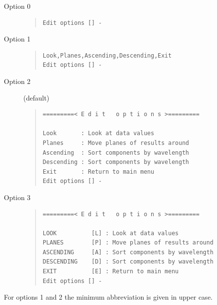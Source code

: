 \documentclass[11pt,twoside]{article}
\begin{document}

\begin{description}
\item[Option 0]\mbox{}

\begin{quote}\begin{verbatim}
Edit options [] -
\end{verbatim}\end{quote}

\item[Option 1]\mbox{}

\begin{quote}\begin{verbatim}
Look,Planes,Ascending,Descending,Exit
Edit options [] -
\end{verbatim}\end{quote}

\item[Option 2] (default)

\begin{quote}\begin{verbatim}
=========< E d i t   o p t i o n s >=========

Look       : Look at data values
Planes     : Move planes of results around
Ascending  : Sort components by wavelength
Descending : Sort components by wavelength
Exit       : Return to main menu
Edit options [] -
\end{verbatim}\end{quote}

\item[Option 3]\mbox{}

\begin{quote}\begin{verbatim}
=========< E d i t   o p t i o n s >=========

LOOK          [L] : Look at data values
PLANES        [P] : Move planes of results around
ASCENDING     [A] : Sort components by wavelength
DESCENDING    [D] : Sort components by wavelength
EXIT          [E] : Return to main menu
Edit options [] -
\end{verbatim}\end{quote}

\end{description}

For options 1 and 2 the minimum abbreviation is given in upper case.
\end{document}
